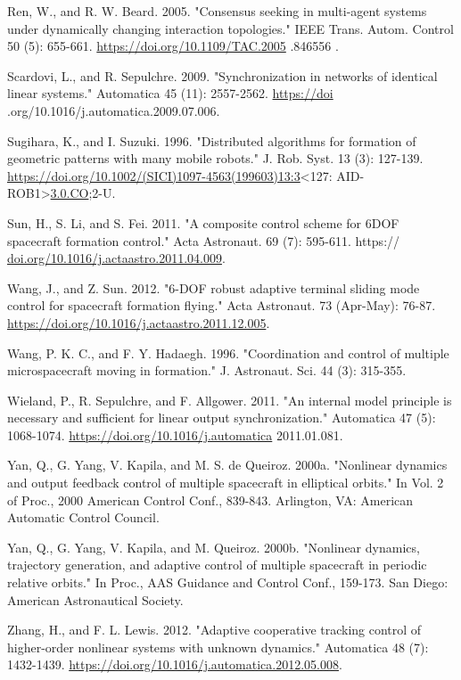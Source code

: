 \documentclass[10pt]{article}
\begin{document}
Ren, W., and R. W. Beard. 2005. "Consensus seeking in multi-agent systems under dynamically changing interaction topologies." IEEE Trans. Autom. Control 50 (5): 655-661. \href{https://doi.org/10.1109/TAC.2005}{https://doi.org/10.1109/TAC.2005} .846556 .

Scardovi, L., and R. Sepulchre. 2009. "Synchronization in networks of identical linear systems." Automatica 45 (11): 2557-2562. \href{https://doi}{https://doi} .org/10.1016/j.automatica.2009.07.006.

Sugihara, K., and I. Suzuki. 1996. "Distributed algorithms for formation of geometric patterns with many mobile robots." J. Rob. Syst. 13 (3):
127-139. \href{https://doi.org/10.1002/(SICI)1097-4563(199603)13:3}{https://doi.org/10.1002/(SICI)1097-4563(199603)13:3}<127: AID-ROB1>\href{http://3.0.CO}{3.0.CO};2-U.

Sun, H., S. Li, and S. Fei. 2011. "A composite control scheme for 6DOF spacecraft formation control." Acta Astronaut. 69 (7): 595-611. https:// \href{http://doi.org/10.1016/j.actaastro.2011.04.009}{doi.org/10.1016/j.actaastro.2011.04.009}.

Wang, J., and Z. Sun. 2012. "6-DOF robust adaptive terminal sliding mode control for spacecraft formation flying." Acta Astronaut. 73 (Apr-May): 76-87. \href{https://doi.org/10.1016/j.actaastro.2011.12.005}{https://doi.org/10.1016/j.actaastro.2011.12.005}.

Wang, P. K. C., and F. Y. Hadaegh. 1996. "Coordination and control of multiple microspacecraft moving in formation." J. Astronaut. Sci. 44 (3): 315-355.

Wieland, P., R. Sepulchre, and F. Allgower. 2011. "An internal model principle is necessary and sufficient for linear output synchronization." Automatica 47 (5): 1068-1074. \href{https://doi.org/10.1016/j.automatica}{https://doi.org/10.1016/j.automatica} 2011.01.081.

Yan, Q., G. Yang, V. Kapila, and M. S. de Queiroz. 2000a. "Nonlinear dynamics and output feedback control of multiple spacecraft in elliptical orbits." In Vol. 2 of Proc., 2000 American Control Conf., 839-843. Arlington, VA: American Automatic Control Council.

Yan, Q., G. Yang, V. Kapila, and M. Queiroz. 2000b. "Nonlinear dynamics, trajectory generation, and adaptive control of multiple spacecraft in periodic relative orbits." In Proc., AAS Guidance and Control Conf., 159-173. San Diego: American Astronautical Society.

Zhang, H., and F. L. Lewis. 2012. "Adaptive cooperative tracking control of higher-order nonlinear systems with unknown dynamics." Automatica 48 (7): 1432-1439. \href{https://doi.org/10.1016/j.automatica.2012.05.008}{https://doi.org/10.1016/j.automatica.2012.05.008}.
\end{document}
